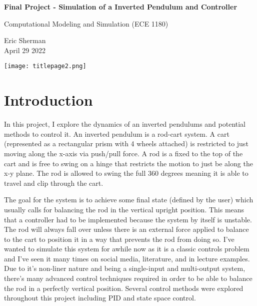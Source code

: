 \documentclass{article}
\begin{document}
\begin{titlepage}
    \begin{center}
        \vspace*{1cm}
            
        \LARGE
        \textbf{Final Project - Simulation of a Inverted Pendulum and Controller}
            
        \vspace{0.5cm}
        \Large
        Computational Modeling and Simulation (ECE 1180)
        
            
        \vspace{0.5cm}
        \large
        Eric Sherman \\
        April 29 2022
        
        \vspace{2cm}
        \texttt{[image: titlepage2.png]}
            
        \vfill
        
    \end{center}
\end{titlepage}


\tableofcontents
\vfill


\section{Introduction}

In this project, I explore the dynamics of an inverted pendulums and potential methods to control it. An inverted pendulum is a rod-cart system. A cart (represented as a rectangular prism with 4 wheels attached) is restricted to just moving along the x-axis via push/pull force. A rod is a fixed to the top of the cart and is free to swing on a hinge that restricts the motion to just be along the x-y plane. The rod is allowed to swing the full 360 degrees meaning it is able to travel and clip through the cart.

The goal for the system is to achieve some final state (defined by the user) which usually calls for balancing the rod in the vertical upright position. This means that a controller had to be implemented because the system by itself is unstable. The rod will always fall over unless there is an external force applied to balance to the cart to position it in a way that prevents the rod from doing so. I've wanted to simulate this system for awhile now as it is a classic controls problem and I've seen it many times on social media, literature, and in lecture examples. Due to it's non-liner nature and being a single-input and multi-output system, there's many advanced control techniques required in order to be able to balance the rod in a perfectly vertical position. Several control methods were explored throughout this project including PID and state space control. 
\end{document}
